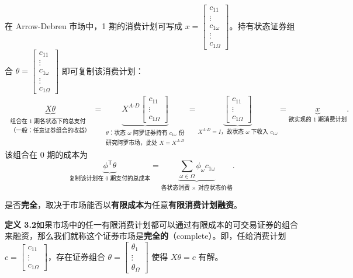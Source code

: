 \begin{tcolorbox}[knowledge,title=3.3 市场的完全性]
在 Arrow-Debreu 市场中，1 期的消费计划可写成 $x=\begin{bmatrix}c_{11} \\ \vdots \\ c_{1\omega} \\ \vdots \\ c_{1\Omega}\end{bmatrix}$。持有状态证券组合 $\theta=\begin{bmatrix}c_{11} \\ \vdots \\ c_{1\omega} \\ \vdots \\ c_{1\Omega}\end{bmatrix}$ 即可复制该消费计划：
\[
    \begin{aligned}
        \underbrace{X\theta}_{\substack{\text{组合在 1 期各状态下的总支付}\\\text{（一般：任意证券组合的收益）}}}
        =\underbrace{X^{A\text{-}D}\begin{bmatrix}c_{11} \\ \vdots \\ c_{1\Omega}\end{bmatrix}}_{\substack{\theta\text{：状态 }\omega\text{ 阿罗证券持有 }c_{1\omega}\text{ 份}\\\text{研究阿罗市场，此处 }X=X^{A\text{-}D}}}
        =\underbrace{\begin{bmatrix}c_{11} \\ \vdots \\ c_{1\Omega}\end{bmatrix}}_{X^{A\text{-}D}=I\text{，故状态 }\omega\text{ 下收入 }c_{1\omega}}
        =\underbrace{x}_{\text{欲实现的 1 期消费计划}}.
    \end{aligned}
\]
该组合在 0 期的成本为
\[
    \underbrace{\phi^{\mathsf T}\theta}_{\text{复制该计划在 0 期支付的总成本}}
    =\underbrace{\sum_{\omega\in\Omega}\phi_{\omega}c_{1\omega}}_{\text{各状态消费 }\times\text{ 对应状态价格}}.
\]

是否\textbf{完全}，取决于市场能否以\textbf{有限成本}为任意\textbf{有限消费计划}\textbf{融资}。

\begin{tcolorbox}[knowledge]
\textbf{定义 3.2}\quad 如果市场中的任一有限消费计划都可以通过有限成本的可交易证券的组合来融资，那么我们就称这个证券市场是\textbf{完全的}（complete）。即，任给消费计划 $c=\begin{bmatrix}c_{11} \\ \vdots \\ c_{1\Omega}\end{bmatrix}$，存在证券组合 $\theta=\begin{bmatrix}\theta_1 \\ \vdots \\ \theta_{\Omega}\end{bmatrix}$ 使得 $X\theta=c$ 有解。
\end{tcolorbox}




\end{tcolorbox}
